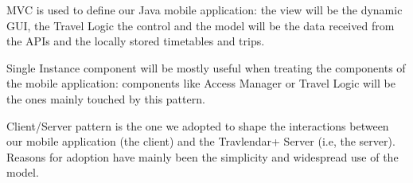MVC is used to define our Java mobile application: the view will be the dynamic GUI, the Travel Logic the control and the model will be the data received from the APIs and the locally stored timetables and trips.

Single Instance component will be mostly useful when treating the components of the mobile application: components like Access Manager or Travel Logic will be the ones mainly touched by this pattern.

Client/Server pattern is the one we adopted to shape the interactions between our mobile application (the client) and the Travlendar+ Server (i.e, the server). Reasons for adoption have mainly been the simplicity and widespread use of the model.
